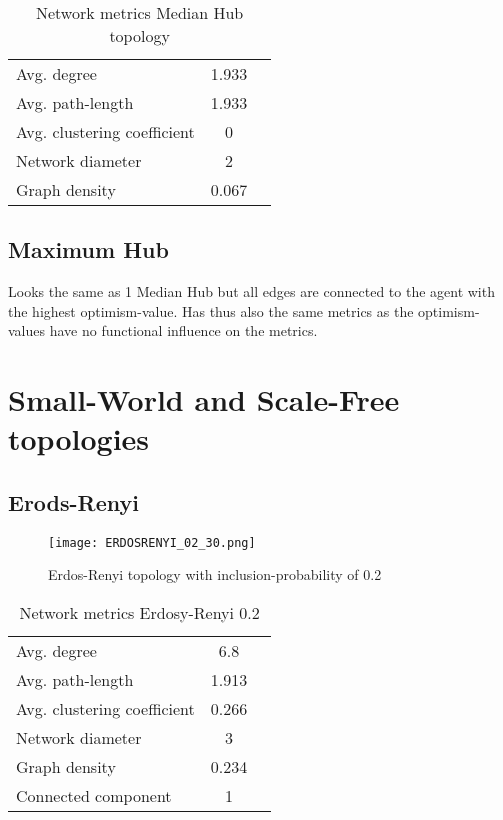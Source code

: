 \documentclass[Bachelorarbeit.tex]{subfiles}
\begin{document}
\begin{table}[h]
	\centering
	\caption{Network metrics Median Hub topology}
	\begin{tabular} { l c r }
		\hline
		Avg. degree & 1.933 \\
		Avg. path-length & 1.933 \\
		Avg. clustering coefficient & 0 \\
		Network diameter & 2 \\
		Graph density & 0.067 \\
		\hline
	\end{tabular}
\end{table}

\subsection{Maximum Hub}
Looks the same as 1 Median Hub but all edges are connected to the agent with the highest optimism-value.
Has thus also the same metrics as the optimism-values have no functional influence on the metrics.

\section{Small-World and Scale-Free topologies}
\subsection{Erods-Renyi}

\begin{figure}[H]
	\centering
  \texttt{[image: ERDOSRENYI\_02\_30.png]}
	\caption{Erdos-Renyi topology with inclusion-probability of 0.2}
	\label{fig1}
\end{figure}

\begin{table}[h]
	\centering
	\caption{Network metrics Erdosy-Renyi 0.2}
	\begin{tabular} { l c r }
		\hline
		Avg. degree & 6.8 \\
		Avg. path-length & 1.913 \\
		Avg. clustering coefficient &  0.266 \\
		Network diameter & 3 \\
		Graph density & 0.234 \\
		Connected component & 1 \\
		\hline
	\end{tabular}
\end{table}
\end{document}
